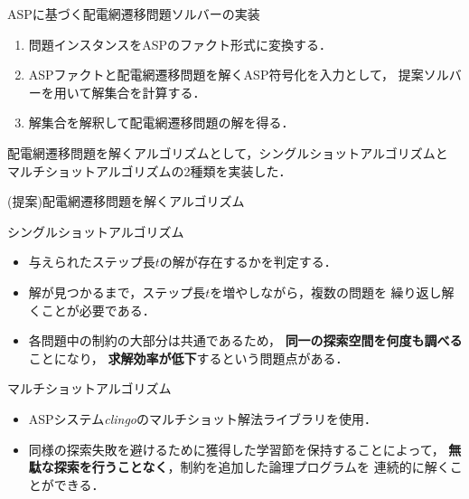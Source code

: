\documentclass[dvipdfmx,11pt]{beamer}
\begin{document}
\begin{frame}{ASPに基づく配電網遷移問題ソルバーの実装}
 \centering
 \scalebox{0.55}{}
 \vfill
 \begin{enumerate}
  \item 問題インスタンスをASPのファクト形式に変換する．
  \item ASPファクトと配電網遷移問題を解くASP符号化を入力として，
        提案ソルバーを用いて解集合を計算する．
  \item 解集合を解釈して配電網遷移問題の解を得る．
 \end{enumerate}\vfill
 \begin{alertblock}{}
  配電網遷移問題を解くアルゴリズムとして，シングルショットアルゴリズムと
  マルチショットアルゴリズムの2種類を実装した．
 \end{alertblock}
\end{frame}
\begin{frame}{(提案)配電網遷移問題を解くアルゴリズム}
 \begin{block}{シングルショットアルゴリズム}
    \begin{itemize}
    \item 与えられたステップ長$t$の解が存在するかを判定する．
    \item 解が見つかるまで，ステップ長$t$を増やしながら，複数の問題を
          繰り返し解くことが必要である．
    \item 各問題中の制約の大部分は共通であるため，
      \textbf{同一の探索空間を何度も調べる}ことになり，
      \textbf{求解効率が低下}するという問題点がある．
  \end{itemize}
 \end{block}
 \vfill
 \begin{alertblock}{マルチショットアルゴリズム}
   \begin{itemize}
   \item ASPシステム\textit{clingo}のマルチショット解法ライブラリを使用．
   \item 同様の探索失敗を避けるために獲得した学習節を保持することによって，
		 \textbf{無駄な探索を行うことなく}，制約を追加した論理プログラムを
		 連続的に解くことができる．
  \end{itemize}
 \end{alertblock}
\end{frame}
\end{document}
